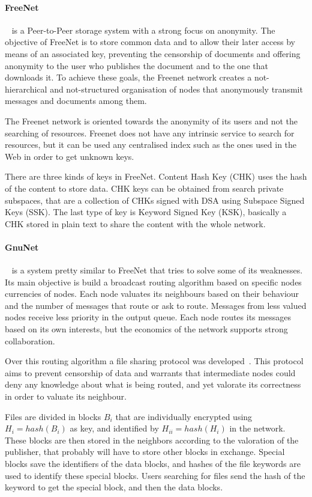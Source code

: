 \documentclass{llncs}
\begin{document}
\paragraph{FreeNet}~\cite{FREENET} is a Peer-to-Peer storage system with a strong focus on anonymity. The objective of FreeNet is to store common data and to allow their later access by means of an associated key, preventing the censorship of documents and offering anonymity to the user who publishes the document and to the one that downloads it. To achieve these goals, the Freenet network creates a not-hierarchical and not-structured organisation of nodes that anonymously transmit messages and documents among them. 

The Freenet network is oriented towards the anonymity of its users and not the searching of resources. Freenet does not have any intrinsic service to search for resources, but it can be used any centralised index such as the ones used in the Web in order to get unknown keys.

There are three kinds of keys in FreeNet. Content Hash Key (CHK) uses the hash of the content to store data. CHK keys can be obtained from search private subspaces, that are a collection of CHKs signed with DSA using Subspace Signed Keys (SSK). The last type of key is Keyword Signed Key (KSK), basically a CHK stored in plain text to share the content with the whole network.

\paragraph{GnuNet}~\cite{GNUNET} is a system pretty similar to FreeNet that tries to solve some of its
weaknesses. Its main objective is build a broadcast routing algorithm based on specific nodes currencies of
nodes. Each node valuates its neighbours based on their behaviour and the number of messages that route or
ask to route. Messages from less valued nodes receive less priority in the output queue. Each node
routes its messages based on its own interests, but the economics of the network supports
strong collaboration.

Over this routing algorithm a file sharing protocol was developed~\cite{ECRS}.  This protocol aims to prevent
censorship of data and warrants that intermediate nodes could deny any knowledge about what is being routed,
and yet valorate its correctness in order to valuate its neighbour.

Files are divided in blocks $B_i$ that are individually encrypted using $H_i=hash(B_i)$ as key,
and identified by $H_{ii}=hash(H_i)$ in the network. These blocks are then stored in
the neighbors according to the valoration of the publisher, that probably will have to store other blocks in
exchange. Special blocks save the identifiers of the data blocks, and hashes of the file keywords are used
to identify these special blocks. Users searching for files send the hash of the keyword to get the special block,
and then the data blocks. 
\end{document}

